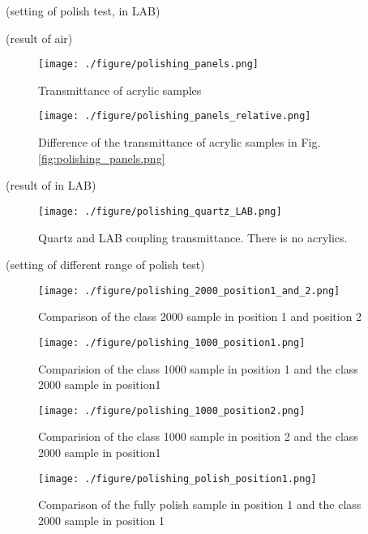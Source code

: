 (setting of polish test, in LAB)




(result of air)
\begin{figure}
    \centering
    \texttt{[image: ./figure/polishing\_panels.png]}
    \caption{Transmittance of acrylic samples}
    \label{polishing_panels.png}
    \end{figure}



\begin{figure}
    \centering
    \texttt{[image: ./figure/polishing\_panels\_relative.png]}
    \caption{Difference of the transmittance of acrylic samples in Fig. \ref{fig:polishing_panels.png}}
    \label{polishing_panels_relative.png}
    \end{figure}


(result of in LAB)
\begin{figure}
    \centering
    \texttt{[image: ./figure/polishing\_quartz\_LAB.png]}
    \caption{Quartz and LAB coupling transmittance. There is no acrylics.}
    \label{polishing_quartz_LAB.png}
    \end{figure}



(setting of different range of polish test)
\begin{figure}
    \centering
    \texttt{[image: ./figure/polishing\_2000\_position1\_and\_2.png]}
    \caption{Comparison of the class 2000 sample in position 1 and position 2}
    \label{polishing_2000_position1_and_2.png}
    \end{figure}



\begin{figure}
    \centering
    \texttt{[image: ./figure/polishing\_1000\_position1.png]}
    \caption{Comparision of the class 1000 sample in position 1 and the class 2000 sample in position1}
    \label{polishing_1000_position1.png}
    \end{figure}


\begin{figure}
    \centering
    \texttt{[image: ./figure/polishing\_1000\_position2.png]}
    \caption{Comparision of the class 1000 sample in position 2 and the class 2000 sample in position1}
    \label{polishing_1000_position2.png}
    \end{figure}

\begin{figure}
    \centering
    \texttt{[image: ./figure/polishing\_polish\_position1.png]}
    \caption{Comparison of the fully polish sample in position 1 and the class 2000 sample in position 1}
    \label{polishing_polish_position1.png}
    \end{figure}

